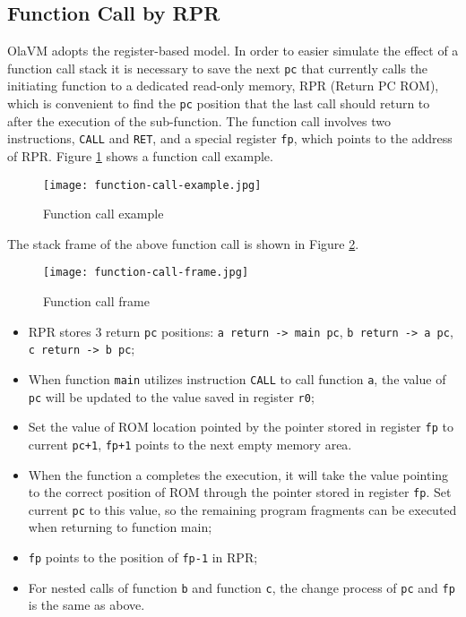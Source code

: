 \subsection{Function Call by RPR}

OlaVM adopts the register-based model. In order to easier simulate the effect of a function call stack it is necessary to save the next \verb|pc| that currently calls the initiating function to a dedicated read-only memory, RPR (Return PC ROM), which is convenient to find the \verb|pc| position that the last call should return to after the execution of the sub-function. The function call involves two instructions, \verb|CALL| and \verb|RET|, and a special register \verb|fp|, which points to the address of RPR. Figure \ref{fig:function-call-example} shows a function call example.
\begin{figure}[!ht]
    \centering
    \texttt{[image: function-call-example.jpg]}
    \caption{Function call example}
    \label{fig:function-call-example}
\end{figure}

The stack frame of the above function call is shown in Figure \ref{fig:function-call-frame}.
\begin{figure}[!ht]
    \centering
    \texttt{[image: function-call-frame.jpg]}
    \caption{Function call frame}
    \label{fig:function-call-frame}
\end{figure}

\begin{itemize}
    \item RPR stores 3 return \verb|pc| positions: \verb|a return -> main pc|, \verb|b return -> a pc|, \verb|c return -> b pc|;
    \item When function \verb|main| utilizes instruction \verb|CALL| to call function \verb|a|, the value of \verb|pc| will be updated to the value saved in register \verb|r0|;
    \item Set the value of ROM location pointed by the pointer stored in register \verb|fp| to current \verb|pc+1|, \verb|fp+1| points to the next empty memory area.
    \item When the function a completes the execution, it will take the value pointing to the correct position of ROM through the pointer stored in register \verb|fp|. Set current \verb|pc| to this value, so the remaining program fragments can be executed when returning to function main;
    \item \verb|fp| points to the position of \verb|fp-1| in RPR;
    \item For nested calls of function \verb|b| and function \verb|c|, the change process of \verb|pc| and \verb|fp| is the same as above.
\end{itemize}

